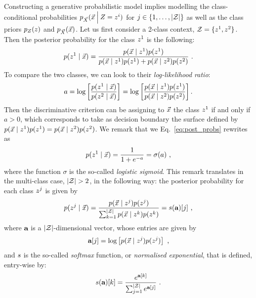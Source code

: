 Constructing a generative probabilistic model implies modelling the class-conditional probabilities $p_{\vec{X}}(\vec{x} \:\Big\vert\: Z = z^i)$ for $j\in \{1,\dots,\lvert\mathcal{Z}\rvert\}$ as well as the class priors $p_{Z}(z)$ and $p_{\vec{X}}(\vec{x})$. Let us first consider a 2-class context, \ie $\mathcal{Z} = \{z^1, z^2\}$. Then the posterior probability for the class $z^1$ is the following:
\begin{equation}\label{eq:post_probs}
p(z^1\mid \vec{x}) = \frac{p(\vec{x}\mid z^1)p(z^1)}{p(\vec{x}\mid z^1)p(z^1) + p(\vec{x}\mid z^2)p(z^2)}\mbox{ .}
\end{equation}
To compare the two classes, we can look to their \emph{log-likelihood ratio}:
\begin{equation}\label{eq:log-ratio}
a = \log\left[\frac{p(z^1\mid \vec{x})}{p(z^2\mid \vec{x})}\right] =  \log\left[\frac{p(\vec{x}\mid z^1)p(z^1)}{p(\vec{x}\mid z^2)p(z^2)}\right].
\end{equation}
Then the discriminative criterion can be assigning to $\vec{x}$ the class $z^1$ if and only if $a>0$, which corresponds to take as decision boundary the surface defined by $p(\vec{x}\mid z^1)p(z^1) = p(\vec{x}\mid z^2)p(z^2)$.
We remark that we Eq.~\eqref{eq:post_probs} rewrites as
\begin{equation}\label{eq:post_probs_sigmoid}
p(z^1\mid \vec{x}) = \frac{1}{1+e^{-a}} = \sigma(a)\mbox{ ,}
\end{equation}
where the function $\sigma$ is the so-called \emph{logistic sigmoid}. This remark translates in the multi-class case, \ie $\lvert\mathcal{Z}\rvert >2$, in the following way: the posterior probability for each class $z^j$ is given by
\begin{equation}\label{eq:post_probs_multi-class}
p(z^j\mid \vec{x}) = \frac{p(\vec{x}\mid z^j)p(z^j)}{\sum_{k=1}^{\lvert\mathcal{Z}\rvert}p(\vec{x}\mid z^k)p(z^k )} = s (\textbf{a})[j]\mbox{ ,}
\end{equation}
where $\textbf{a}$ is a $\lvert\mathcal{Z}\rvert$-dimensional vector, whose entries are given by
\begin{equation}
\textbf{a}[j] = \log\left[ p(\vec{x}\mid z^j)p(z^j) \right] \mbox{ ,}
\end{equation}
and $s$ is the so-called \emph{softmax} function, or \emph{normalised exponential}, that is defined, entry-wise by:
\begin{equation}\label{eq:softmax}
s(\textbf{a})[k] = \frac{e^{\textbf{a}[k]}}{\sum_{j=1}^{\lvert\mathcal{Z}\rvert}e^{\textbf{a}[j]}}\mbox{ .}
\end{equation}

